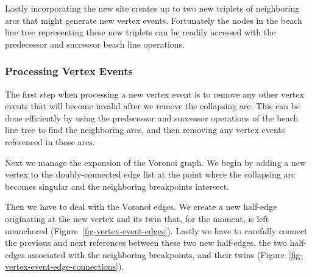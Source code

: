 \documentclass[
  letterpaper,
  DIV=11,
  numbers=noendperiod]{scrartcl}
\begin{document}
Lastly incorporating the new site creates up to two new triplets of
neighboring arcs that might generate new vertex events. Fortunately the
nodes in the beach line tree representing these new triplets can be
readily accessed with the predecessor and successor beach line
operations.

\subsubsection{Processing Vertex Events}\label{processing-vertex-events}

The first step when processing a new vertex event is to remove any other
vertex events that will become invalid after we remove the collapsing
arc. This can be done efficiently by using the predecessor and successor
operations of the beach line tree to find the neighboring arcs, and then
removing any vertex events referenced in those arcs.

Next we manage the expansion of the Voronoi graph. We begin by adding a
new vertex to the doubly-connected edge list at the point where the
collapsing arc becomes singular and the neighboring breakpoints
intersect.

Then we have to deal with the Voronoi edges. We create a new half-edge
originating at the new vertex and its twin that, for the moment, is left
unanchored (Figure~\ref{fig-vertex-event-edges}). Lastly we have to
carefully connect the previous and next references between these two new
half-edges, the two half-edges associated with the neighboring
breakpoints, and their twins
(Figure~\ref{fig-vertex-event-edge-connections}).
\end{document}
